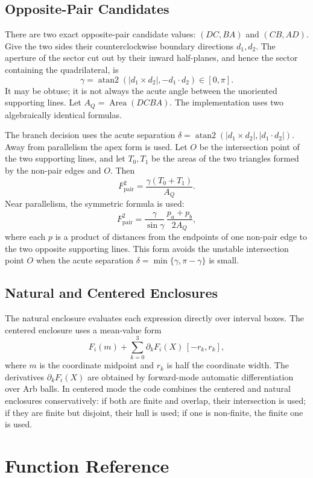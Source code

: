 \documentclass[11pt]{article}
\newcommand{\Area}{\operatorname{Area}}
\begin{document}
\subsection{Opposite-Pair Candidates}

There are two exact opposite-pair candidate values: \((DC,BA)\) and
\((CB,AD)\).  Give the two sides their counterclockwise boundary directions
\(d_1,d_2\).  The aperture of the sector cut out by their inward half-planes,
and hence the sector containing the quadrilateral, is
\[
  \gamma=\operatorname{atan2}(|d_1\mathbin\times d_2|,-d_1\mathbin\cdot d_2)
  \in[0,\pi].
\]
It may be obtuse; it is not always the acute angle between the unoriented
supporting lines.  Let \(A_Q=\Area(DCBA)\).  The implementation uses two
algebraically identical formulas.

The branch decision uses the acute separation
\(\delta=\operatorname{atan2}(|d_1\times d_2|,|d_1\cdot d_2|)\).  Away from
parallelism the apex form is used.  Let \(O\) be the intersection point of the
two supporting lines, and let \(T_0,T_1\) be the areas of the two triangles
formed by the non-pair edges and \(O\).  Then
\[
  F_{\mathrm{pair}}^2 = \frac{\gamma(T_0+T_1)}{A_Q}.
\]
Near parallelism, the symmetric formula is used:
\[
  F_{\mathrm{pair}}^2 =
  \frac{\gamma}{\sin\gamma}\,
  \frac{p_a+p_b}{2A_Q},
\]
where each \(p\) is a product of distances from the endpoints of one non-pair
edge to the two opposite supporting lines.  This form avoids the unstable
intersection point \(O\) when the acute separation
\(\delta=\min\{\gamma,\pi-\gamma\}\) is small.

\subsection{Natural and Centered Enclosures}

The natural enclosure evaluates each expression directly over interval boxes.
The centered enclosure uses a mean-value form
\[
  F_i(m) + \sum_{k=0}^{3} \partial_k F_i(X)\,[-r_k,r_k],
\]
where \(m\) is the coordinate midpoint and \(r_k\) is half the coordinate
width.  The derivatives \(\partial_kF_i(X)\) are obtained by forward-mode
automatic differentiation over Arb balls.  In centered mode the code combines
the centered and natural enclosures conservatively: if both are finite and
overlap, their intersection is used; if they are finite but disjoint, their
hull is used; if one is non-finite, the finite one is used.

\section{Function Reference}
\end{document}
